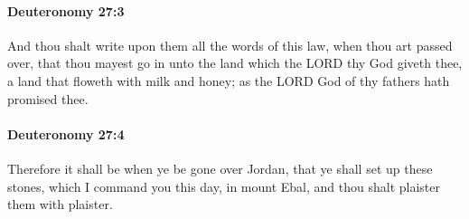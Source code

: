 		\paragraph{Deuteronomy 27:3} %
			\label{DEUTERONOMY-27-3}

			And thou shalt write upon them all the words of this law, when thou art passed over, that thou mayest go in unto the land which the LORD thy God giveth thee, a land that floweth with milk and honey; as the LORD God of thy fathers hath promised thee.


		\paragraph{Deuteronomy 27:4} %
			\label{DEUTERONOMY-27-4}

			Therefore it shall be when ye be gone over Jordan, that ye shall set up these stones, which I command you this day, in mount Ebal, and thou shalt plaister them with plaister.

